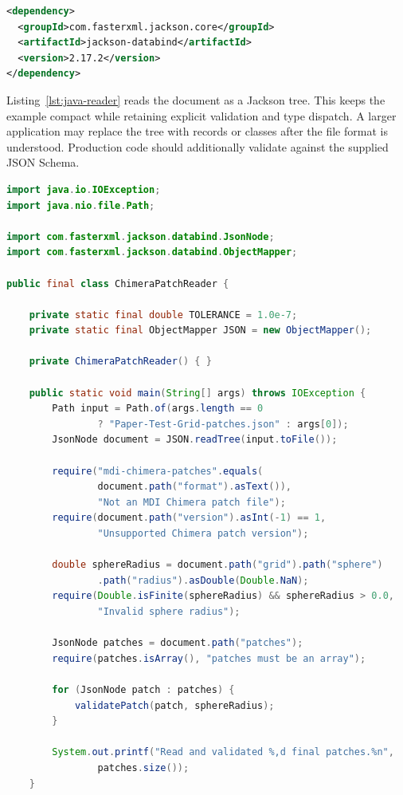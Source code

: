 \documentclass[11pt]{article}
\begin{document}
\begin{lstlisting}[language=XML,caption={Maven dependency for the example}]
<dependency>
  <groupId>com.fasterxml.jackson.core</groupId>
  <artifactId>jackson-databind</artifactId>
  <version>2.17.2</version>
</dependency>
\end{lstlisting}

Listing~\ref{lst:java-reader} reads the document as a Jackson tree.  This keeps
the example compact while retaining explicit validation and type dispatch.  A
larger application may replace the tree with records or classes after the file
format is understood.  Production code should additionally validate against
the supplied JSON Schema.

\begin{lstlisting}[language=Java,caption={Java 17 parser, curve evaluator, and closure check},label={lst:java-reader}]
import java.io.IOException;
import java.nio.file.Path;

import com.fasterxml.jackson.databind.JsonNode;
import com.fasterxml.jackson.databind.ObjectMapper;

public final class ChimeraPatchReader {

    private static final double TOLERANCE = 1.0e-7;
    private static final ObjectMapper JSON = new ObjectMapper();

    private ChimeraPatchReader() { }

    public static void main(String[] args) throws IOException {
        Path input = Path.of(args.length == 0
                ? "Paper-Test-Grid-patches.json" : args[0]);
        JsonNode document = JSON.readTree(input.toFile());

        require("mdi-chimera-patches".equals(
                document.path("format").asText()),
                "Not an MDI Chimera patch file");
        require(document.path("version").asInt(-1) == 1,
                "Unsupported Chimera patch version");

        double sphereRadius = document.path("grid").path("sphere")
                .path("radius").asDouble(Double.NaN);
        require(Double.isFinite(sphereRadius) && sphereRadius > 0.0,
                "Invalid sphere radius");

        JsonNode patches = document.path("patches");
        require(patches.isArray(), "patches must be an array");

        for (JsonNode patch : patches) {
            validatePatch(patch, sphereRadius);
        }

        System.out.printf("Read and validated %,d final patches.%n",
                patches.size());
    }


\end{lstlisting}
\end{document}
